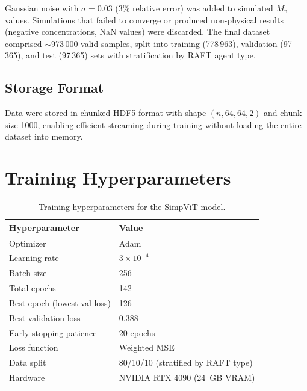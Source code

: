 \documentclass[journal=mamobx,manuscript=suppinfo]{achemso}
\begin{document}
Gaussian noise with $\sigma = 0.03$ (3\% relative error) was added to
simulated $M_{\mathrm{n}}$ values. Simulations that failed to converge or
produced non-physical results (negative concentrations, NaN values) were
discarded. The final dataset comprised $\sim$973\,000 valid samples, split
into training (778\,963), validation (97\,365), and test (97\,365) sets
with stratification by RAFT agent type.

\subsection{Storage Format}

Data were stored in chunked HDF5 format with shape $(n, 64, 64, 2)$ and
chunk size 1000, enabling efficient streaming during training without
loading the entire dataset into memory.

\section{Training Hyperparameters}
\label{sec:training}

\begin{table}[htbp]
\centering
\caption{Training hyperparameters for the SimpViT model.}
\label{tab:hyperparams}
\begin{tabular}{@{}ll@{}}
\toprule
Hyperparameter & Value \\
\midrule
Optimizer & Adam \\
Learning rate & $3 \times 10^{-4}$ \\
Batch size & 256 \\
Total epochs & 142 \\
Best epoch (lowest val loss) & 126 \\
Best validation loss & 0.388 \\
Early stopping patience & 20 epochs \\
Loss function & Weighted MSE \\
Data split & 80/10/10 (stratified by RAFT type) \\
Hardware & NVIDIA RTX 4090 (24~GB VRAM) \\
\bottomrule
\end{tabular}
\end{table}

\end{document}
